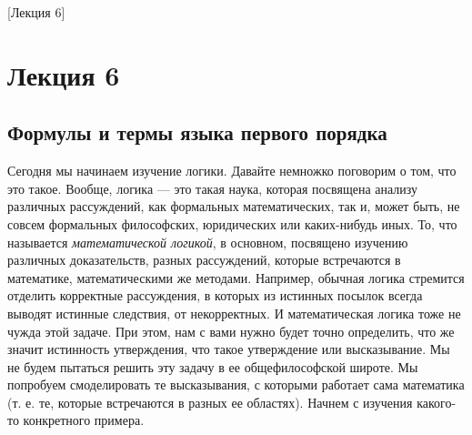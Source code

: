 [Лекция 6]

\section{Лекция 6}

\subsection{Формулы и термы языка первого порядка}

Сегодня мы начинаем изучение логики.
Давайте немножко поговорим о том, что это такое.
Вообще, логика --- это такая наука, которая посвящена анализу различных рассуждений, как формальных математических, так и, может быть, не совсем формальных философских, юридических или каких-нибудь иных.
То, что называется {\it математической логикой}, в основном, посвящено изучению различных доказательств, разных рассуждений, которые встречаются в математике, математическими же методами.
Например, обычная логика стремится отделить корректные рассуждения, в которых из истинных посылок всегда выводят истинные следствия, от некорректных.
И математическая логика тоже не чужда этой задаче.
При этом, нам с вами нужно будет точно определить, что же значит истинность утверждения, что такое утверждение или высказывание.
Мы не будем пытаться решить эту задачу в ее общефилософской широте.
Мы попробуем смоделировать те высказывания, с которыми работает сама математика (т. е. те, которые встречаются в разных ее областях).
Начнем с изучения какого-то конкретного примера.

